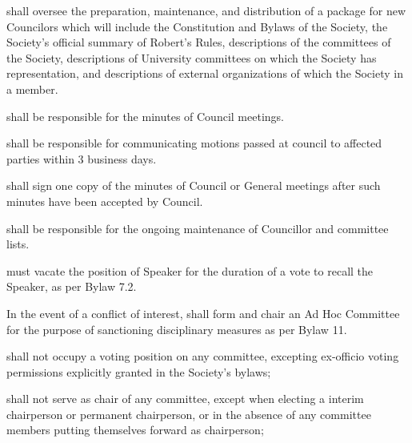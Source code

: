 \begin{longenum}[ label*=\thesubsection.\arabic*., align=left]
    \item shall oversee the preparation, maintenance, and distribution of a package for new Councilors which will include the Constitution and Bylaws of the Society, the Society's official summary of Robert's Rules, descriptions of the committees of the Society, descriptions of University committees on which the Society has representation, and descriptions of external organizations of which the Society in a member.
    \item shall be responsible for the minutes of Council meetings.
    \item shall be responsible for communicating motions passed at council to affected parties within 3 business days. 
    \item shall sign one copy of the minutes of Council or General meetings after such minutes have been accepted by Council.
    \item shall be responsible for the ongoing maintenance of Councillor and committee lists.
    \item must vacate the position of Speaker for the duration of a vote to recall the Speaker, as per Bylaw 7.2.
    \item In the event of a conflict of interest, shall form and chair an Ad Hoc Committee for the purpose of sanctioning disciplinary measures as per Bylaw 11.
     \item shall not occupy a voting position on any committee, excepting ex-officio voting permissions explicitly granted in the Society’s bylaws;
	\item shall not serve as chair of any committee, except when electing a interim chairperson or permanent chairperson, or in the absence of any committee members putting themselves forward as chairperson;
\end{longenum}

